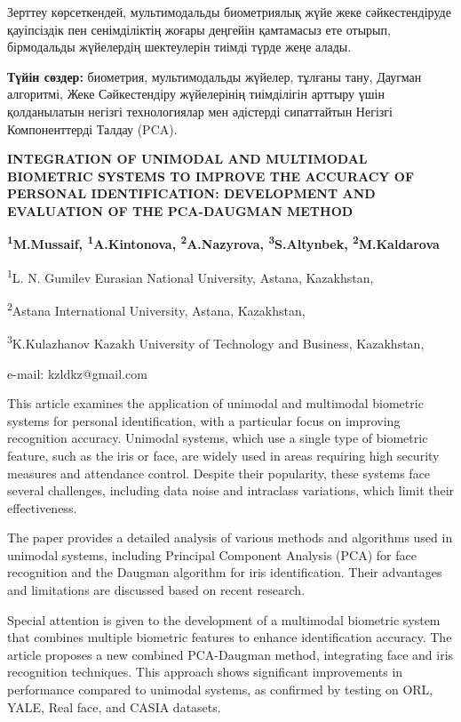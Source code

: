 Зерттеу көрсеткендей, мультимодальды биометриялық жүйе жеке
сәйкестендіруде қауіпсіздік пен сенімділіктің жоғары деңгейін қамтамасыз
ете отырып, бірмодальды жүйелердің шектеулерін тиімді түрде жеңе алады.

{\bfseries Түйін сөздер:} биометрия, мультимодальды жүйелер, тұлғаны
тану, Даугман алгоритмі, Жеке Сәйкестендіру жүйелерінің тиімділігін
арттыру үшін қолданылатын негізгі технологиялар мен әдістерді
сипаттайтын Негізгі Компоненттерді Талдау (PCA).

\begin{center}
{\large\bfseries INTEGRATION OF UNIMODAL AND MULTIMODAL BIOMETRIC SYSTEMS TO
IMPROVE THE ACCURACY OF PERSONAL IDENTIFICATION: DEVELOPMENT AND
EVALUATION OF THE PCA-DAUGMAN METHOD}

{\bfseries \textsuperscript{1}M.Mussaif\envelope, \textsuperscript{1}A.Kintonova,
\textsuperscript{2}A.Nazyrova, \textsuperscript{3}S.Altynbek,
\textsuperscript{2}M.Kaldarova}

\textsuperscript{1}L. N. Gumilev Eurasian National University, Astana,
Kazakhstan,

\textsuperscript{2}Astana International University, Astana, Kazakhstan,

\textsuperscript{3}K.Kulazhanov Kazakh University of Technology and
Business, Kazakhstan,

e-mail: kzldkz@gmail.com
\end{center}

This article examines the application of unimodal and multimodal
biometric systems for personal identification, with a particular focus
on improving recognition accuracy. Unimodal systems, which use a single
type of biometric feature, such as the iris or face, are widely used in
areas requiring high security measures and attendance control. Despite
their popularity, these systems face several challenges, including data
noise and intraclass variations, which limit their effectiveness.

The paper provides a detailed analysis of various methods and algorithms
used in unimodal systems, including Principal Component Analysis (PCA)
for face recognition and the Daugman algorithm for iris identification.
Their advantages and limitations are discussed based on recent research.

Special attention is given to the development of a multimodal biometric
system that combines multiple biometric features to enhance
identification accuracy. The article proposes a new combined PCA-Daugman
method, integrating face and iris recognition techniques. This approach
shows significant improvements in performance compared to unimodal
systems, as confirmed by testing on ORL, YALE, Real face, and CASIA
datasets.


